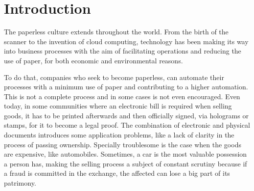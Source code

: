 \section{Introduction}
The paperless culture extends throughout the world. 
From the birth of the scanner to the invention of cloud computing, 
technology has been making its way into business processes 
with the aim of facilitating operations and reducing the use of paper, 
for both economic and environmental reasons. 

To do that, 
companies who seek to become paperless, can automate their processes with a 
minimum use of paper and contributing to a higher automation.
This is not a complete process and in some cases is not even encouraged.
Even today, 
in some communities where an electronic bill is required when selling goods, 
it has to be printed afterwards and then officially signed, 
via holograms or stamps, 
for it to become a legal proof. 
The combination of electronic and physical documents introduces some application problems, 
like a lack of clarity in the process of passing ownership.
Specially troublesome is the case when the goods are expensive, like automobiles.
Sometimes, a car is the most valuable possession a person has, 
making the selling process a subject of constant scrutiny 
because if a fraud is committed in the exchange, 
the affected can lose a big part of its patrimony.

